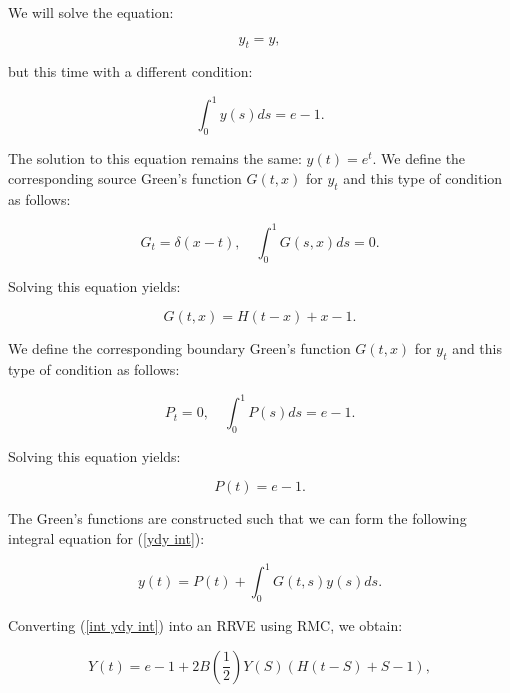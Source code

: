 \documentclass[a4paper,12pt]{article}
\begin{document}
\begin{example}[$y_t=y$ average condition]
  We will solve the equation:

  \begin{equation} \label{ydy int}
    y_t = y,
  \end{equation}

  but this time with a different condition:

  \begin{equation}
    \int_{0}^{1} y(s) ds = e-1.
  \end{equation}

  The solution to this equation remains the same: $y(t) = e^{t}$.
  We define the corresponding source Green's function $G(t,x)$ for $y_t$
  and this type of condition as follows:

  \begin{equation}
    G_t = \delta(x-t), \quad \int_{0}^{1} G(s,x) ds = 0.
  \end{equation}

  Solving this equation yields:

  \begin{equation}
    G(t,x) = H(t-x) + x - 1.
  \end{equation}

  We define the corresponding boundary Green's function $G(t,x)$ for $y_t$
  and this type of condition as follows:

  \begin{equation}
    P_{t} = 0, \quad \int_{0}^{1} P(s) ds = e -1.
  \end{equation}

  Solving this equation yields:

  \begin{equation}
    P(t) = e -1.
  \end{equation}

  The Green's functions are constructed such that
  we can form the following integral equation for (\ref{ydy int}):

  \begin{equation} \label{int ydy int}
    y(t) = P(t) + \int_{0}^{1} G(t,s) y(s) ds.
  \end{equation}

  Converting (\ref{int ydy int}) into an RRVE
  using RMC, we obtain:

  \begin{equation}\label{RRVE ydy int}
    Y(t) = e - 1 + 2B\left(\frac{1}{2}\right)Y(S)(H(t-S)+S-1),
  \end{equation}


\end{example}
\end{document}
